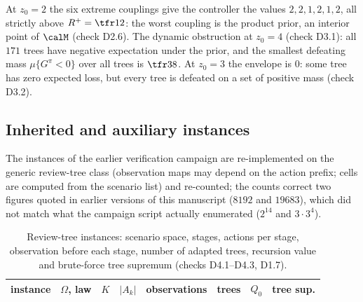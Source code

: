 At $z_0=2$ the six extreme couplings give the controller the values $2,2,1,2,1,2$, all strictly above $R^+=\tfr12$: the worst coupling is the product prior, an interior point of $\calM$ (check D2.6). The dynamic obstruction at $z_0=4$ (check D3.1): all $171$ trees have negative expectation under the prior, and the smallest defeating mass $\mu\{G^\pi<0\}$ over all trees is $\tfr38$. At $z_0=3$ the envelope is $0$: some tree has zero expected loss, but every tree is defeated on a set of positive mass (check D3.2).

\subsection{Inherited and auxiliary instances}
The instances of the earlier verification campaign are re-implemented on the generic review-tree class (observation maps may depend on the action prefix; cells are computed from the scenario list) and re-counted; the counts correct two figures quoted in earlier versions of this manuscript ($8192$ and $19683$), which did not match what the campaign script actually enumerated ($2^{14}$ and $3\cdot3^4$).

\begin{table}[H]
\centering\small
\caption{Review-tree instances: scenario space, stages, actions per stage, observation before each stage, number of adapted trees, recursion value and brute-force tree supremum (checks D4.1--D4.3, D1.7).}
\begin{tabular}{llcclccc}
\toprule
instance & $\Omega$, law & $K$ & $|A_k|$ & observations & trees & $Q_0$ & tree sup.\\
\midrule

\bottomrule
\end{tabular}
\end{table}

